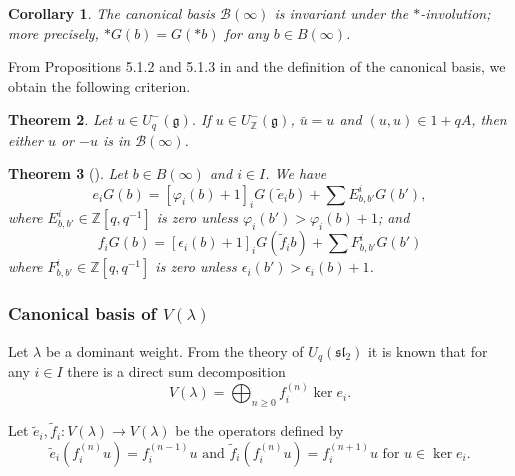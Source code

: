 \documentclass[final]{amsart}
\theoremstyle{plain}
\newtheorem{corollary}{Corollary}[section]
\newtheorem{theorem}[corollary]{Theorem}
\theoremstyle{definition}
\newcommand{\calB}{\mathcal B}
\newcommand{\bbZ}{\mathbb Z}
\newcommand{\frakg}{\mathfrak g}
\newcommand{\fraksl}{\mathfrak{sl}}
\newcommand{\te}{\tilde e}
\newcommand{\tf}{\tilde f}
\begin{document}
\begin{corollary}
    \label{corollary:canonical-basis-star-invariance}
    The canonical basis $\calB(\infty)$ is invariant under the $*$-involution; more precisely, $*G(b) = G(*b)$ for any $b \in B(\infty)$.
\end{corollary}

From Propositions 5.1.2 and 5.1.3 in \cite{Kashiwara:CrystalBases-QuantizedUniversalEnvelopingAlgebras} and the definition of the canonical basis, we obtain the following criterion.
\begin{theorem}
    \label{theorem:canonical-basis-criterion}
    Let $u \in U_q^-(\frakg)$. If $u \in U_\bbZ^-(\frakg)$, $\bar u = u$ and $(u, u) \in 1+qA$, then either $u$ or $-u$ is in $\calB(\infty)$.
\end{theorem}

\begin{theorem}[{\cite{Kashiwara:CrystalBases-QuantizedUniversalEnvelopingAlgebras}}]
    \label{theorem:matrix-coefficients-lower-global-crystal-basis}
    Let $b \in B(\infty)$ and $i \in I$.
    We have
    \begin{equation}
        \label{equation:e-left-multiplication-canonical-basis}
        e_i G(b) = [\varphi_i(b)+1]_i G(\te_i b) + \sum E_{b,b'}^i G(b'),
    \end{equation}
    where $E_{b,b'}^i \in \bbZ[q,q^{-1}]$ is zero unless $\varphi_i(b') > \varphi_i(b)+1$; and
    \begin{equation}
        \label{equation:f-left-multiplication-canonical-basis}
        f_i G(b) = [\epsilon_i(b)+1]_i G(\tf_i b) + \sum F_{b,b'}^i G(b')
    \end{equation}
    where $F_{b,b'}^i \in \bbZ[q,q^{-1}]$ is zero unless $\epsilon_i(b') > \epsilon_i(b)+1$.
\end{theorem}

\subsubsection*{Canonical basis of $V(\lambda)$}
\label{section:canonical-basis-module-definition}

Let $\lambda$ be a dominant weight.
From the theory of $U_q(\fraksl_2)$ it is known that for any $i\in I$ there is a direct sum decomposition
\[
    V(\lambda) = \bigoplus_{n\ge 0} f_i^{(n)} \ker e_i.
\]

Let $\te_i, \tf_i\colon V(\lambda) \to V(\lambda)$ be the operators defined by
\[
    \te_i (f_i^{(n)} u) = f_i^{(n-1)} u \text{ and } \tf_i (f_i^{(n)} u) = f_i^{(n+1)} u \text{ for } u \in \ker e_i.
\]
\end{document}
